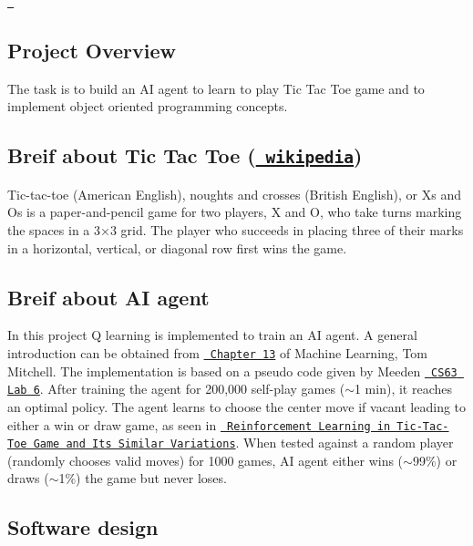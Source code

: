 \href{https://travis-ci.com/ajeetwankhede/Tic-Tac-Toe}\texttt{ } 



\subsection*{Project Overview}

The task is to build an AI agent to learn to play Tic Tac Toe game and to implement object oriented programming concepts.

\subsection*{Breif about Tic Tac Toe (\href{https://en.wikipedia.org/wiki/Tic-tac-toe}\texttt{ wikipedia})}

Tic-\/tac-\/toe (American English), noughts and crosses (British English), or Xs and Os is a paper-\/and-\/pencil game for two players, X and O, who take turns marking the spaces in a 3×3 grid. The player who succeeds in placing three of their marks in a horizontal, vertical, or diagonal row first wins the game.

 

\subsection*{Breif about AI agent}

In this project Q learning is implemented to train an AI agent. A general introduction can be obtained from \href{https://www.cs.swarthmore.edu/~meeden/cs63/f11/ml-ch13.pdf}\texttt{ Chapter 13} of Machine Learning, Tom Mitchell. The implementation is based on a pseudo code given by Meeden \href{https://www.cs.swarthmore.edu/~meeden/cs63/f11/lab6.php}\texttt{ C\+S63 Lab 6}. After training the agent for 200,000 self-\/play games ($\sim$1 min), it reaches an optimal policy. The agent learns to choose the center move if vacant leading to either a win or draw game, as seen in \href{https://www.cs.dartmouth.edu/~lorenzo/teaching/cs134/Archive/Spring2009/final/PengTao/final_report.pdf}\texttt{ Reinforcement Learning in Tic-\/\+Tac-\/\+Toe Game and Its Similar Variations}. When tested against a random player (randomly chooses valid moves) for 1000 games, AI agent either wins ($\sim$99\%) or draws ($\sim$1\%) the game but never loses.

\subsection*{Software design}


